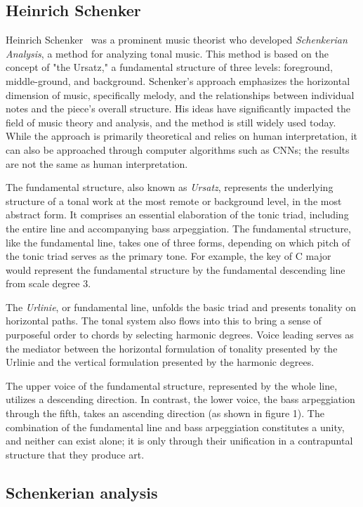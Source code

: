 \subsection{Heinrich Schenker}

Heinrich Schenker~\cite{schenkerdocumentsonline} was a prominent music theorist who developed \textit{Schenkerian Analysis}, a method for analyzing tonal music. This method is based on the concept of "the Ursatz," a fundamental structure of three levels: foreground, middle-ground, and background. Schenker's approach emphasizes the horizontal dimension of music, specifically melody, and the relationships between individual notes and the piece's overall structure. His ideas have significantly impacted the field of music theory and analysis, and the method is still widely used today. While the approach is primarily theoretical and relies on human interpretation, it can also be approached through computer algorithms such as CNNs; the results are not the same as human interpretation.

The fundamental structure, also known as \textit{Ursatz}, represents the underlying structure of a tonal work at the most remote or background level, in the most abstract form. It comprises an essential elaboration of the tonic triad, including the entire line and accompanying bass arpeggiation. The fundamental structure, like the fundamental line, takes one of three forms, depending on which pitch of the tonic triad serves as the primary tone. For example, the key of C major would represent the fundamental structure by the fundamental descending line from scale degree 3.

The \textit{Urlinie}, or fundamental line, unfolds the basic triad and presents tonality on horizontal paths. The tonal system also flows into this to bring a sense of purposeful order to chords by selecting harmonic degrees. Voice leading serves as the mediator between the horizontal formulation of tonality presented by the Urlinie and the vertical formulation presented by the harmonic degrees.

The upper voice of the fundamental structure, represented by the whole line, utilizes a descending direction. In contrast, the lower voice, the bass arpeggiation through the fifth, takes an ascending direction (as shown in figure 1). The combination of the fundamental line and bass arpeggiation constitutes a unity, and neither can exist alone; it is only through their unification in a contrapuntal structure that they produce art.

\subsection{Schenkerian analysis}

